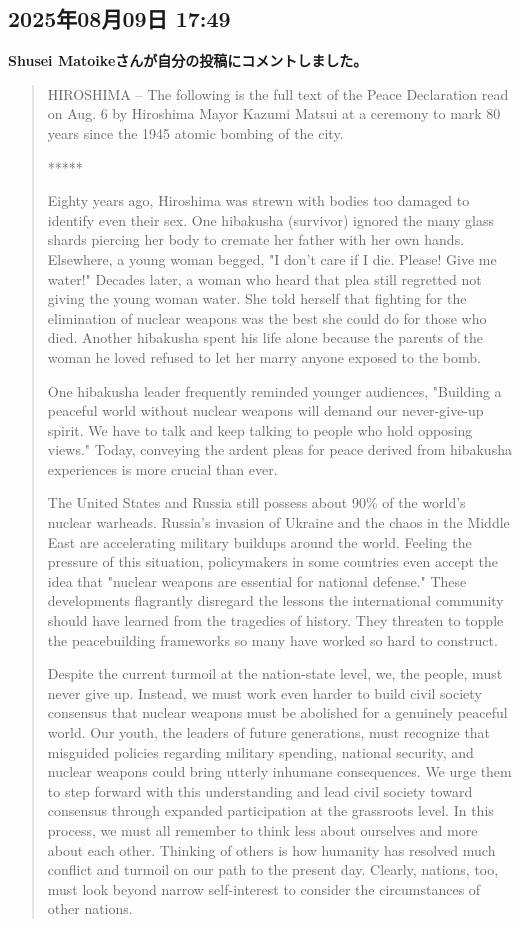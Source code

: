 \subsection*{2025年08月09日 17:49}

\textbf{Shusei Matoikeさんが自分の投稿にコメントしました。}

\begin{quote}
HIROSHIMA -- The following is the full text of the Peace Declaration read on Aug. 6 by Hiroshima Mayor Kazumi Matsui at a ceremony to mark 80 years since the 1945 atomic bombing of the city.

*****

Eighty years ago, Hiroshima was strewn with bodies too damaged to identify even their sex. One hibakusha (survivor) ignored the many glass shards piercing her body to cremate her father with her own hands. Elsewhere, a young woman begged, "I don't care if I die. Please! Give me water!" Decades later, a woman who heard that plea still regretted not giving the young woman water. She told herself that fighting for the elimination of nuclear weapons was the best she could do for those who died. Another hibakusha spent his life alone because the parents of the woman he loved refused to let her marry anyone exposed to the bomb.

One hibakusha leader frequently reminded younger audiences, "Building a peaceful world without nuclear weapons will demand our never-give-up spirit. We have to talk and keep talking to people who hold opposing views." Today, conveying the ardent pleas for peace derived from hibakusha experiences is more crucial than ever.

The United States and Russia still possess about 90\% of the world's nuclear warheads. Russia's invasion of Ukraine and the chaos in the Middle East are accelerating military buildups around the world. Feeling the pressure of this situation, policymakers in some countries even accept the idea that "nuclear weapons are essential for national defense." These developments flagrantly disregard the lessons the international community should have learned from the tragedies of history. They threaten to topple the peacebuilding frameworks so many have worked so hard to construct.

Despite the current turmoil at the nation-state level, we, the people, must never give up. Instead, we must work even harder to build civil society consensus that nuclear weapons must be abolished for a genuinely peaceful world. Our youth, the leaders of future generations, must recognize that misguided policies regarding military spending, national security, and nuclear weapons could bring utterly inhumane consequences. We urge them to step forward with this understanding and lead civil society toward consensus through expanded participation at the grassroots level. In this process, we must all remember to think less about ourselves and more about each other. Thinking of others is how humanity has resolved much conflict and turmoil on our path to the present day. Clearly, nations, too, must look beyond narrow self-interest to consider the circumstances of other nations.


\end{quote}
